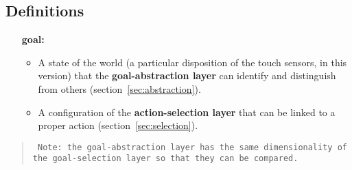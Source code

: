 \documentclass[11pt]{article}
\begin{document}
\subsection{Definitions}

\begin{itemize}[leftmargin=3cm]  
    \item[\textbf{goal:}]

        \begin{itemize}

            \item A state of the world (a particular disposition of the touch sensors, in this version) that the \textbf{goal-abstraction layer}
                can identify and distinguish from others
                (section~\ref{sec:abstraction}).

            \item A configuration of the \textbf{action-selection layer} that
                can be linked to a proper action (section~\ref{sec:selection}).

        \end{itemize}

\end{itemize}

\begin{quote}
    \texttt{
        Note: the goal-abstraction layer has the same dimensionality of\\ 
        the goal-selection layer so that they can be compared.
    }

\end{quote}
\end{document}
